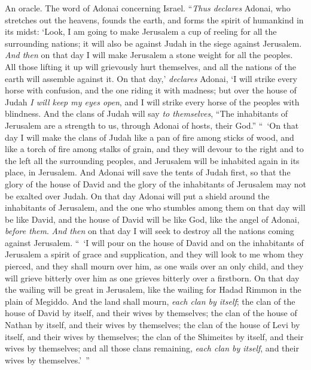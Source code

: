 \begin{biblechapter} %
 An oracle. The word of Adonai concerning Israel. “\textit{Thus declares} Adonai, who stretches out the heavens, founds the earth, and forms the spirit of humankind in its midst:
\verse ‘Look, I am going to make Jerusalem a cup of reeling for all the surrounding nations; it will also be against Judah in the siege against Jerusalem.
\verse \textit{And then} on that day I will make Jerusalem a stone weight for all the peoples. All those lifting it up will grievously hurt themselves, and all the nations of the earth will assemble against it.
\verse On that day,’ \textit{declares} Adonai, ‘I will strike every horse with confusion, and the one riding it with madness; but over the house of Judah \textit{I will keep my eyes open}, and I will strike every horse of the peoples with blindness.
\verse And the clans of Judah will say \textit{to themselves}, “The inhabitants of Jerusalem are a strength to us, through Adonai of hosts, their God.”
\verse “ ‘On that day I will make the clans of Judah like a pan of fire among sticks of wood, and like a torch of fire among stalks of grain, and they will devour to the right and to the left all the surrounding peoples, and Jerusalem will be inhabited again in its place, in Jerusalem.
\verse And Adonai will save the tents of Judah first, so that the glory of the house of David and the glory of the inhabitants of Jerusalem may not be exalted over Judah.
\verse On that day Adonai will put a shield around the inhabitants of Jerusalem, and the one who stumbles among them on that day will be like David, and the house of David will be like God, like the angel of Adonai, \textit{before them}.
\verse \textit{And then} on that day I will seek to destroy all the nations coming against Jerusalem.
\verse “ ‘I will pour on the house of David and on the inhabitants of Jerusalem a spirit of grace and supplication, and they will look to me whom they pierced, and they shall mourn over him, as one wails over an only child, and they will grieve bitterly over him as one grieves bitterly over a firstborn.
\verse On that day the wailing will be great in Jerusalem, like the wailing for Hadad Rimmon in the plain of Megiddo.
\verse And the land shall mourn, \textit{each clan by itself}; the clan of the house of David by itself, and their wives by themselves; the clan of the house of Nathan by itself, and their wives by themselves;
\verse the clan of the house of Levi by itself, and their wives by themselves; the clan of the Shimeites by itself, and their wives by themselves;
\verse and all those clans remaining, \textit{each clan by itself}, and their wives by themselves.’ ”
\end{biblechapter}

